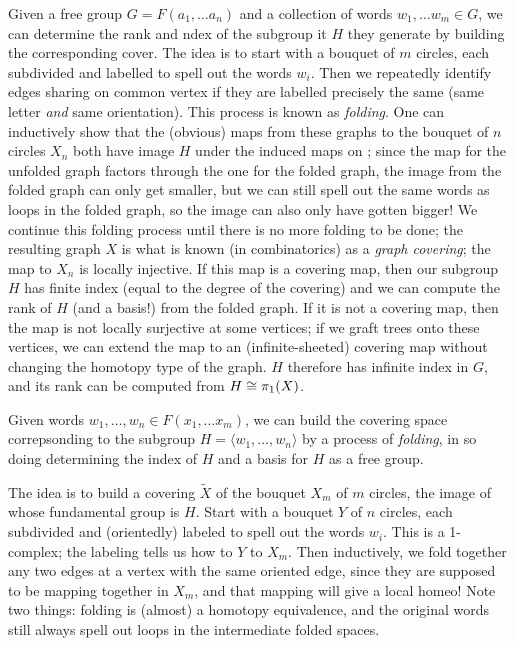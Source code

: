 \vfill
\eject


Given a free group
$G=F(a_1,\ldots a_n)$ and a collection of words $w_1,\ldots w_m\in G$,
we can determine the rank and ndex of the subgroup it $H$ they
generate by building the corresponding cover. The idea is
to start with a bouquet of $m$ circles, each subdivided 
and labelled to spell
out the words $w_i$. Then we repeatedly identify edges sharing
on common vertex if they are labelled precisely the same (same
letter {\it and} same orientation). This process is known
as {\it folding}. One can inductively show that the (obvious)
maps from these graphs to the bouquet of $n$ circles $X_n$ both
have image $H$ under the induced maps on \mpu ; since the map 
for the unfolded graph
factors through the one for the folded graph, the image from the
folded graph can only get smaller, but we can still spell out
the same words as loops in the folded graph, so the image can
also only have gotten bigger! We continue this folding process until there
is no more folding to be done; the resulting graph $X$ is what is 
known (in combinatorics) as a {\it graph covering}; the map to $X_n$
is locally injective. If this map is a covering map, then our subgroup
$H$ has finite index (equal to the degree of the
covering) and we can compute the rank of $H$ (and a basis!) from the 
folded graph. If it is not a covering map, then the map is not locally surjective at
some vertices; if we graft trees onto these vertices, we can extend the map
to an (infinite-sheeted) covering map without changing the homotopy
type of the graph. $H$ therefore has infinite index in $G$, and its
rank can be computed from $H\cong \pi_1(X)$. 

\vfill
\eject

Given words $w_1,\ldots,w_n\in F(x_1,\ldots x_m)$, we can build the covering space correpsonding
to the subgroup $H=\langle w_1,\ldots,w_n\rangle$ by a process of {\it folding}, in so doing 
determining the index of $H$ and a basis for $H$ as a free group. 

\msk

The idea is to build a 
covering $\widetilde{X}$ of the bouquet $X_m$ of $m$ circles, 
the image of whose fundamental group 
is $H$. Start with a bouquet $Y$ of $n$ circles, each subdivided and (orientedly) 
labeled to spell out the words 
$w_i$. This is a 1-complex; the labeling tells us how to 
$Y$ to $X_m$. Then inductively, we fold together any two edges at a vertex with the same oriented edge,
since they are supposed to be mapping together in $X_m$, and that mapping will 
 give a local homeo!
Note two things: folding is (almost) a homotopy equivalence, 
and the original words still always spell out loops in the intermediate folded spaces.

